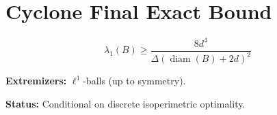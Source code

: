 \documentclass{article}
\begin{document}
\section*{Cyclone Final Exact Bound}

\[
\lambda_1(B)\ge
\frac{8d^4}{\Delta(\operatorname{diam}(B)+2d)^2}
\]

\textbf{Extremizers:} $\ell^1$-balls (up to symmetry).

\textbf{Status:} Conditional on discrete isoperimetric optimality.
\end{document}

